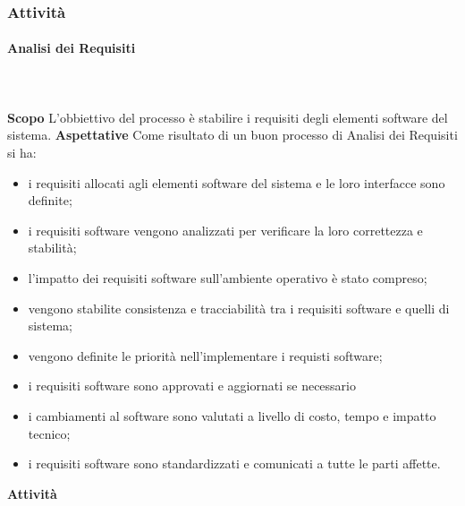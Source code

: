 	\subsubsection{Attività}
		\paragraph{Analisi dei Requisiti} \mbox{}\\ \mbox{}\\
			\textbf{Scopo} \newline \newline
			L'obbiettivo del processo è stabilire i requisiti degli elementi software del sistema.
			\newline \newline
			\textbf{Aspettative}\newline \newline
			Come risultato di un buon processo di Analisi dei Requisiti si ha:
			\begin{itemize}
			\item i requisiti allocati agli elementi software del sistema e le loro interfacce sono definite;
			\item i requisiti software vengono analizzati per verificare la loro correttezza e stabilità;
			\item l'impatto dei requisiti software sull'ambiente operativo è stato compreso;
			\item vengono stabilite consistenza e tracciabilità tra i requisiti software e quelli di sistema;
			\item vengono definite le priorità nell'implementare i requisti software;
			\item i requisiti software sono approvati e aggiornati se necessario
			\item i cambiamenti al software sono valutati a livello di costo, tempo e impatto tecnico;
			\item i requisiti software sono standardizzati e comunicati a tutte le parti affette.
			\end{itemize} 
			\textbf{Attività}  \mbox{}\\ \mbox{}\\
